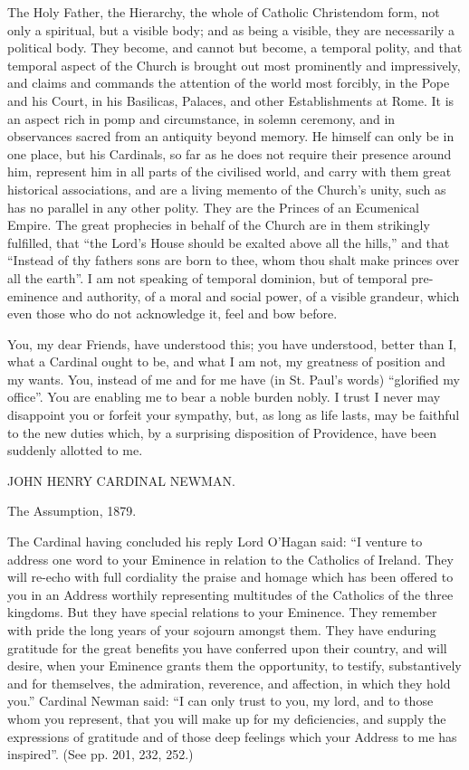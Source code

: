 The Holy Father, the Hierarchy, the whole of Catholic Christendom
form, not only a spiritual, but a visible body; and as being a
visible, they are necessarily a political body. They become, and
cannot but become, a temporal polity, and that temporal aspect of the
Church is brought out most prominently and impressively, and claims
and commands the attention of the world most forcibly, in the Pope and
his Court, in his Basilicas, Palaces, and other Establishments at
Rome. It is an aspect rich in pomp and circumstance, in solemn
ceremony, and in observances sacred from an antiquity beyond memory.
He himself can only be in one place, but his Cardinals, so far as he
does not require their presence around him, represent him in all parts
of the civilised world, and carry with them great historical
associations, and are a living memento of the Church's unity, such as
has no parallel in any other polity. They are the Princes of an
Ecumenical Empire. The great prophecies in behalf of the Church
are in them strikingly fulfilled, that ``the Lord's House should
be exalted above all the hills,'' and that ``Instead of thy
fathers sons are born to thee, whom thou shalt make princes over all
the earth''. I am not speaking of temporal dominion, but of
temporal pre-eminence and authority, of a moral and social power, of a
visible grandeur, which even those who do not acknowledge it, feel and
bow before.

You, my dear Friends, have understood this; you have understood,
better than I, what a Cardinal ought to be, and what I am not, my
greatness of position and my wants. You, instead of me and for me have
(in St. Paul's words) ``glorified my office''. You are
enabling me to bear a noble burden nobly. I trust I never may
disappoint you or forfeit your sympathy, but, as long as life lasts,
may be faithful to the new duties which, by a surprising disposition
of Providence, have been suddenly allotted to me.

JOHN HENRY CARDINAL
NEWMAN.

The Assumption, 1879.

The Cardinal having concluded his reply Lord O'Hagan said: ``I
venture to address one word to your
Eminence in relation to the Catholics of Ireland. They will re-echo
with full cordiality the praise and homage which has been offered to
you in an Address worthily representing multitudes of the Catholics of
the three kingdoms. But they have special relations to your Eminence.
They remember with pride the long years of your sojourn amongst them.
They have enduring gratitude for the great benefits you have conferred
upon their country, and will desire, when your Eminence grants them
the opportunity, to testify, substantively and for themselves, the
admiration, reverence, and affection, in which they hold you.''
Cardinal Newman said: ``I can only trust to you, my lord, and to
those whom you represent, that you will make up for my deficiencies,
and supply the expressions of gratitude and of those deep feelings
which your Address to me has inspired''. (See pp. 201, 232, 252.)

